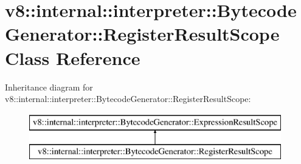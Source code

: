 \hypertarget{classv8_1_1internal_1_1interpreter_1_1_bytecode_generator_1_1_register_result_scope}{}\section{v8\+:\+:internal\+:\+:interpreter\+:\+:Bytecode\+Generator\+:\+:Register\+Result\+Scope Class Reference}
\label{classv8_1_1internal_1_1interpreter_1_1_bytecode_generator_1_1_register_result_scope}
Inheritance diagram for v8\+:\+:internal\+:\+:interpreter\+:\+:Bytecode\+Generator\+:\+:Register\+Result\+Scope\+:\begin{figure}[H]
\begin{center}
\leavevmode
\includegraphics[height=2.000000cm]{classv8_1_1internal_1_1interpreter_1_1_bytecode_generator_1_1_register_result_scope}
\end{center}
\end{figure}
